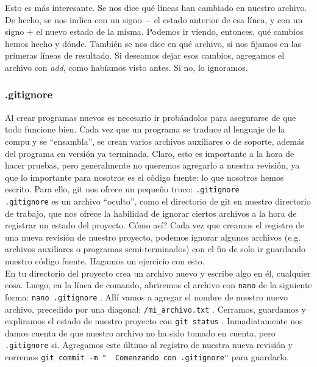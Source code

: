 \documentclass[10pt,letterpaper]{article}
\newcommand{\inlinecode}[1]{
\colorbox{light-gray}{\texttt{#1}}
}
\begin{document}
Esto es m\'as interesante. Se nos dice qu\'e l\'ineas han cambiado en nuestro archivo. De hecho, se nos indica con un signo $-$ el estado anterior de esa l\'inea, y con un signo $+$ el nuevo estado de la misma. Podemos ir viendo, entonces, qu\'e cambios hemos hecho y d\'onde. Tambi\'en se nos dice en qu\'e archivo, si nos fijamos en las primeras l\'ineas de resultado. Si deseamos dejar esos cambios, agregamos el archivo con \emph{add}, como hab\'iamos visto antes. Si no, lo ignoramos.

\subsubsection{.gitignore}
Al crear programas nuevos es necesario ir prob\'andolos para asegurarse de que todo funcione bien. Cada vez que un programa se traduce al lenguaje de la compu y se ``ensambla'', se crean varios archivos auxiliares o de soporte, adem\'as del programa en versi\'on ya terminada. Claro, esto es importante a la hora de hacer pruebas, pero generalmente no queremos agregarlo a nuestra revisi\'on, ya que lo importante para nosotros es el c\'odigo fuente: lo que nosotros hemos escrito. Para ello, git nos ofrece un peque\~no truco: \inlinecode{.gitignore}\\

\inlinecode{.gitignore} es un archivo ``oculto'', como el directorio de git en nuestro directorio de trabajo, que nos ofrece la habilidad de ignorar ciertos archivos a la hora de registrar un estado del proyecto. C\'omo as\'i? Cada vez que creamos el registro de una nueva revisi\'on de nuestro proyecto, podemos ignorar algunos archivos (e.g. archivos auxiliares o programas semi-terminados) con el fin de solo ir guardando nuestro c\'odigo fuente. Hagamos un ejercicio con esto.\\

En tu directorio del proyecto crea un archivo nuevo y escribe algo en \'el, cualquier cosa. Luego, en la l\'inea de comando, abriremos el archivo con \inlinecode{nano} de la siguiente forma: \inlinecode{nano .gitignore}. All\'i vamos a agregar el nombre de nuestro nuevo archivo, precedido por una diagonal: \inlinecode{/mi\_archivo.txt}. Cerramos, guardamos y expliramos el estado de nuestro proyecto con \inlinecode{git status}. Inmadiatamente nos damos cuenta de que nuestro archivo no ha sido tomado en cuenta, pero \inlinecode{.gitignore} si. Agregamos este \'ultimo al registro de nuestra nueva revisi\'on y corremos \inlinecode{git commit -m "\ \hspace{-1em} Comenzando con .gitignore"} para guardarlo.
\end{document}
